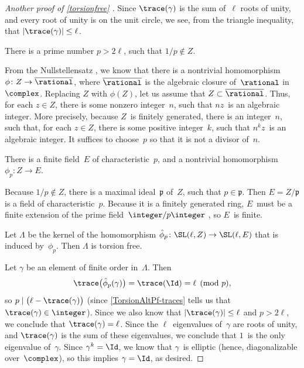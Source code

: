 \begin{proof}[Another proof of \cref{torsionfree} \optional]
Since $\trace(\gamma)$ is the sum of~$\ell$ roots of
unity, and every root of unity is on the unit circle, we
see, from the triangle inequality, that $|\trace(\gamma)|
\le \ell$.

\begin{step}
 There is a prime number $p > 2 \ell$, such that $1/p
\notin Z$.
 \end{step}
 From the Nullstellensatz ,
we know that there is a nontrivial homomorphism $\phi
\colon Z \to \overline{\rational}$, where
$\overline{\rational}$ is the algebraic closure
of~$\rational$ in~$\complex$. Replacing $Z$ with
$\phi(Z)$, let us assume that $Z \subset
\overline{\rational}$. Thus, for each $z \in Z$, there is
some nonzero integer~$n$, such that $nz$~is an algebraic
integer. More precisely, because $Z$~is finitely
generated, there is an integer~$n$, such that, for each $z
\in Z$, there is some positive integer~$k$, such that $n^k
z$~is an algebraic integer. It suffices to choose~$p$ so
that it is not a divisor of~$n$.

\begin{step}
 There is a finite field~$E$ of characteristic~$p$, and a
nontrivial homomorphism $\phi_p \colon Z \to E$.
 \end{step}
 Because $1/p \notin Z$, there is a maximal
ideal~$\mathfrak{p}$ of~$Z$, such that $p \in
\mathfrak{p}$. Then $E = Z/\mathfrak{p}$ is a field of
characteristic~$p$. Because it is a finitely generated
ring, $E$~must be a finite extension of the prime
field~$\integer/p \integer$ , so $E$~is
finite.

\begin{step}
 Let $\Lambda$ be the kernel of the homomorphism
$\hat\phi_p \colon \SL(\ell,Z) \to \SL(\ell, E)$ that is induced by~$\phi_p$. Then
$\Lambda$ is torsion free.
 \end{step}
 Let $\gamma$ be an element of finite order in~$\Lambda$.
Then 
 $$ \trace \bigl( \hat\phi_p(\gamma) \bigr) = \trace(\Id) =
\ell \pmod{p} ,$$
 so $p \mid \bigl( \ell - \trace(\gamma) \bigr)$ (since \cref{TorsionAltPf-traces} tells us that $\trace(\gamma) \in \integer$). Since we also know that $|\trace(\gamma)| \le \ell$ and $p > 2 \ell$, we conclude that $\trace(\gamma) = \ell$. 
 Since the $\ell$~eigenvalues of~$\gamma$ are roots of
unity, and $\trace(\gamma)$ is the sum of these
eigenvalues, we conclude that $1$~is the only eigenvalue
of~$\gamma$. Since $\gamma^k = \Id$, we know that
$\gamma$~is elliptic (hence, diagonalizable
over~$\complex$), so this implies $\gamma = \Id$, as
desired.
 \end{proof}




